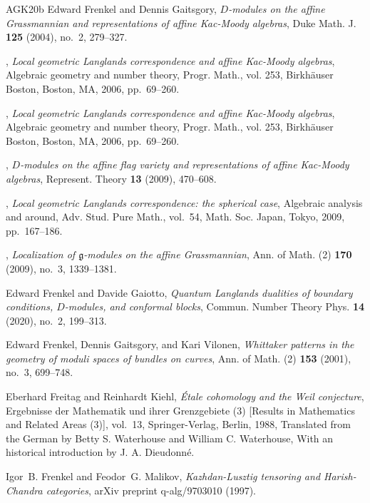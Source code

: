\begin{thebibliography}{AGK{\etalchar{+}}20b}
Edward Frenkel and Dennis Gaitsgory, \emph{{$D$}-modules on the affine
  {G}rassmannian and representations of affine {K}ac-{M}oody algebras}, Duke
  Math. J. \textbf{125} (2004), no.~2, 279--327.

\bysame, \emph{Local geometric {L}anglands correspondence and affine
  {K}ac-{M}oody algebras}, Algebraic geometry and number theory, Progr. Math.,
  vol. 253, Birkh\"{a}user Boston, Boston, MA, 2006, pp.~69--260.

\bysame, \emph{Local geometric {L}anglands correspondence and affine
  {K}ac-{M}oody algebras}, Algebraic geometry and number theory, Progr. Math.,
  vol. 253, Birkh\"{a}user Boston, Boston, MA, 2006, pp.~69--260.

\bysame, \emph{{$D$}-modules on the affine flag variety and representations of
  affine {K}ac-{M}oody algebras}, Represent. Theory \textbf{13} (2009),
  470--608.

\bysame, \emph{Local geometric {L}anglands correspondence: the spherical case},
  Algebraic analysis and around, Adv. Stud. Pure Math., vol.~54, Math. Soc.
  Japan, Tokyo, 2009, pp.~167--186.

\bysame, \emph{Localization of {$\mathfrak{g}$}-modules on the affine
  {G}rassmannian}, Ann. of Math. (2) \textbf{170} (2009), no.~3, 1339--1381.

Edward Frenkel and Davide Gaiotto, \emph{Quantum {L}anglands dualities of
  boundary conditions, {$D$}-modules, and conformal blocks}, Commun. Number
  Theory Phys. \textbf{14} (2020), no.~2, 199--313.

Edward Frenkel, Dennis Gaitsgory, and Kari Vilonen, \emph{Whittaker patterns in
  the geometry of moduli spaces of bundles on curves}, Ann. of Math. (2)
  \textbf{153} (2001), no.~3, 699--748.

Eberhard Freitag and Reinhardt Kiehl, \emph{\'{E}tale cohomology and the {W}eil
  conjecture}, Ergebnisse der Mathematik und ihrer Grenzgebiete (3) [Results in
  Mathematics and Related Areas (3)], vol.~13, Springer-Verlag, Berlin, 1988,
  Translated from the German by Betty S. Waterhouse and William C. Waterhouse,
  With an historical introduction by J. A. Dieudonn\'{e}.

Igor~B. Frenkel and Feodor~G. Malikov, \emph{Kazhdan-{L}usztig tensoring and
  {H}arish-{C}handra categories}, arXiv preprint q-alg/9703010 (1997).


\end{thebibliography}
